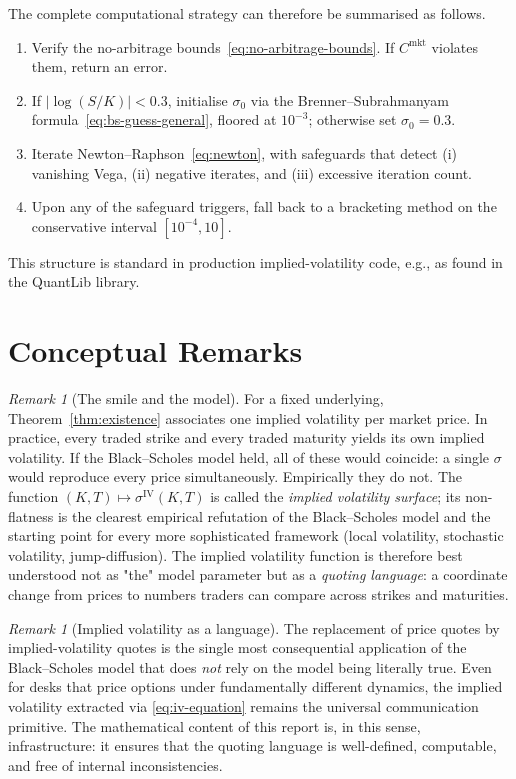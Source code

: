 \documentclass[11pt,a4paper]{article}
\theoremstyle{plain}
\theoremstyle{definition}
\theoremstyle{remark}
\newtheorem{remark}[theorem]{Remark}
\newcommand{\IV}{\mathrm{IV}}
\begin{document}
The complete computational strategy can therefore be summarised as
follows.

\begin{enumerate}
    \item Verify the no-arbitrage bounds~\eqref{eq:no-arbitrage-bounds}.
    If \(C^{\mathrm{mkt}}\) violates them, return an error.
    \item If \(|\log(S/K)| < 0.3\), initialise \(\sigma_0\) via the
    Brenner--Subrahmanyam formula~\eqref{eq:bs-guess-general}, floored
    at \(10^{-3}\); otherwise set \(\sigma_0 = 0.3\).
    \item Iterate Newton--Raphson~\eqref{eq:newton}, with safeguards
    that detect (i) vanishing Vega, (ii) negative iterates, and
    (iii) excessive iteration count.
    \item Upon any of the safeguard triggers, fall back to a
    bracketing method on the conservative interval \([10^{-4}, 10]\).
\end{enumerate}

This structure is standard in production implied-volatility code,
e.g., as found in the QuantLib library.

\section{Conceptual Remarks}

\begin{remark}[The smile and the model]
For a fixed underlying, Theorem~\ref{thm:existence} associates one
implied volatility per market price. In practice, every traded strike
and every traded maturity yields its own implied volatility. If the
Black--Scholes model held, all of these would coincide: a single
\(\sigma\) would reproduce every price simultaneously. Empirically
they do not. The function \((K, T) \mapsto \sigma^{\IV}(K, T)\) is
called the \emph{implied volatility surface}; its non-flatness is the
clearest empirical refutation of the Black--Scholes model and the
starting point for every more sophisticated framework (local
volatility, stochastic volatility, jump-diffusion). The implied
volatility function is therefore best understood not as "the" model
parameter but as a \emph{quoting language}: a coordinate change from
prices to numbers traders can compare across strikes and maturities.
\end{remark}

\begin{remark}[Implied volatility as a language]
The replacement of price quotes by implied-volatility quotes is the
single most consequential application of the Black--Scholes model
that does \emph{not} rely on the model being literally true. Even
for desks that price options under fundamentally different dynamics,
the implied volatility extracted via \eqref{eq:iv-equation} remains
the universal communication primitive. The mathematical content of
this report is, in this sense, infrastructure: it ensures that the
quoting language is well-defined, computable, and free of internal
inconsistencies.
\end{remark}
\end{document}
